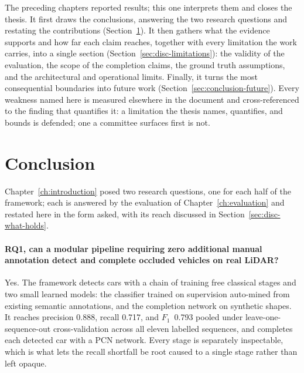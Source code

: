 \documentclass[a4paper,12pt]{report}
\begin{document}
The preceding chapters reported results; this one interprets them and closes the
thesis. It first draws the conclusions, answering the two research questions and
restating the contributions (Section~\ref{sec:conclusion-rqs}). It then gathers what the
evidence supports and how far each claim reaches, together with every limitation the
work carries, into a single section (Section~\ref{sec:disc-limitations}): the
validity of the evaluation, the scope of the completion claims, the ground truth
assumptions, and the architectural and operational limits. Finally, it turns the
most consequential boundaries into future work (Section~\ref{sec:conclusion-future}).
Every weakness named here is measured elsewhere in the document and cross-referenced to
the finding that quantifies it: a limitation the thesis names, quantifies, and bounds is
defended; one a committee surfaces first is not.

\section{Conclusion}
\label{sec:conclusion-rqs}

Chapter~\ref{ch:introduction} posed two research questions, one for each half of the
framework; each is answered by the evaluation of Chapter~\ref{ch:evaluation} and restated
here in the form asked, with its reach discussed in Section~\ref{sec:disc-what-holds}.

\paragraph{RQ1, can a modular pipeline requiring zero additional manual annotation detect
and complete occluded vehicles on real LiDAR?} Yes. The framework detects cars with a chain
of training free classical stages and two small learned models: the classifier trained on
supervision auto-mined from existing semantic annotations, and the completion network on
synthetic shapes. It reaches precision \num{0.888}, recall \num{0.717}, and $F_1$~\num{0.793} pooled under
leave-one-sequence-out cross-validation across all eleven labelled sequences, and completes
each detected car with a PCN network. Every stage is separately inspectable, which is what
lets the recall shortfall be root caused to a single stage rather than left opaque.
\end{document}
